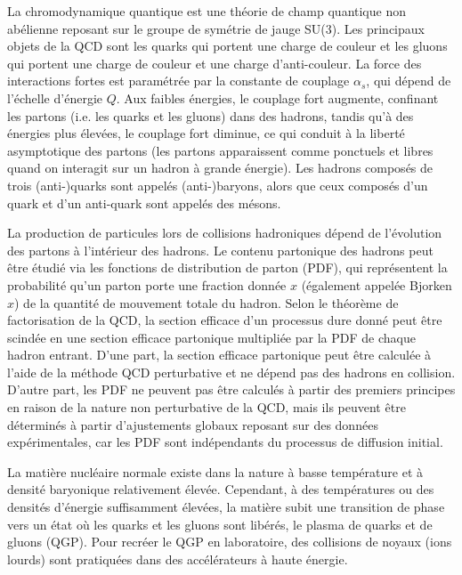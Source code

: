La chromodynamique quantique est une th{\'e}orie de champ quantique non ab{\'e}lienne reposant sur le groupe de sym{\'e}trie de jauge SU(3). Les principaux objets de la QCD sont les quarks qui portent une charge de couleur et les gluons qui portent une charge de couleur et une charge d'anti-couleur. La force des interactions fortes est param{\'e}tr{\'e}e par la constante de couplage $\alpha_{s}$, qui d{\'e}pend de l'{\'e}chelle d'{\'e}nergie $Q$. Aux faibles {\'e}nergies, le couplage fort augmente, confinant les partons (i.e. les quarks et les gluons) dans des hadrons, tandis qu'{\`a} des {\'e}nergies plus {\'e}lev{\'e}es, le couplage fort diminue, ce qui conduit {\`a} la libert{\'e} asymptotique des partons (les partons apparaissent comme ponctuels et libres quand on interagit sur un hadron {\`a} grande {\'e}nergie). Les hadrons compos{\'e}s de trois (anti-)quarks sont appel{\'e}s (anti-)baryons, alors que ceux compos{\'e}s d'un quark et d'un anti-quark sont appel{\'e}s des m{\'e}sons.

La production de particules lors de collisions hadroniques d{\'e}pend de l'{\'e}volution des partons {\`a} l'int{\'e}rieur des hadrons. Le contenu partonique des hadrons peut {\^e}tre {\'e}tudi{\'e} via les fonctions de distribution de parton (PDF), qui repr{\'e}sentent la probabilit{\'e} qu'un parton porte une fraction donn{\'e}e $x$ ({\'e}galement appel{\'e}e Bjorken $x$) de la quantit{\'e} de mouvement totale du hadron. Selon le th{\'e}or{\`e}me de factorisation de la QCD, la section efficace d'un processus dure donn{\'e} peut {\^e}tre scind{\'e}e en une section efficace partonique multipli{\'e}e par la PDF de chaque hadron entrant. D'une part, la section efficace partonique peut {\^e}tre calcul{\'e}e {\`a} l'aide de la m{\'e}thode QCD perturbative et ne d{\'e}pend pas des hadrons en collision. D'autre part, les PDF ne peuvent pas {\^e}tre calcul{\'e}s {\`a} partir des premiers principes en raison de la nature non perturbative de la QCD, mais ils peuvent {\^e}tre d{\'e}termin{\'e}s {\`a} partir d'ajustements globaux reposant sur des donn{\'e}es exp{\'e}rimentales, car les PDF sont ind{\'e}pendants du processus de diffusion initial.

La mati{\`e}re nucl{\'e}aire normale existe dans la nature {\`a} basse temp{\'e}rature et {\`a} densit{\'e} baryonique relativement {\'e}lev{\'e}e. Cependant, {\`a} des temp{\'e}ratures ou des densit{\'e}s d'{\'e}nergie suffisamment {\'e}lev{\'e}es, la mati{\`e}re subit une transition de phase vers un {\'e}tat o{\`u} les quarks et les gluons sont lib{\'e}r{\'e}s, le plasma de quarks et de gluons (QGP). Pour recr{\'e}er le QGP en laboratoire, des collisions de noyaux (ions lourds) sont pratiqu{\'e}es dans des acc{\'e}l{\'e}rateurs {\`a} haute {\'e}nergie.

